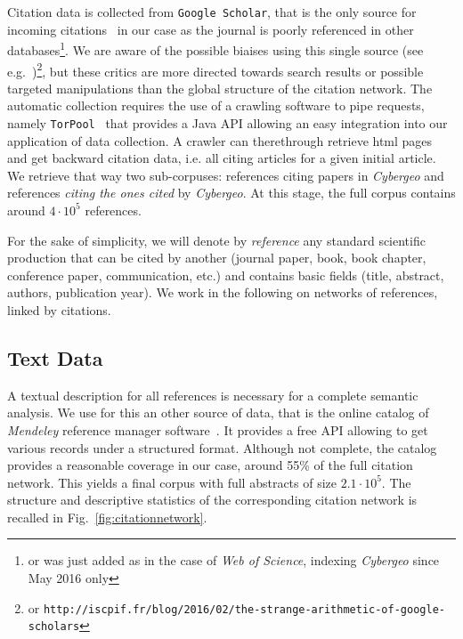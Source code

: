 Citation data is collected from \texttt{Google Scholar}, that is the only source for incoming citations~\citep{noruzi2005google} in our case as the journal is poorly referenced in other databases\footnote{or was just added as in the case of \textit{Web of Science}, indexing \textit{Cybergeo} since May 2016 only}. We are aware of the possible biaises using this single source (see e.g.~\cite{bohannon2014scientific})\footnote{or \texttt{http://iscpif.fr/blog/2016/02/the-strange-arithmetic-of-google-scholars}}, but these critics are more directed towards search results or possible targeted manipulations than the global structure of the citation network. The automatic collection requires the use of a crawling software to pipe requests, namely \texttt{TorPool}~\citep{torpool} that provides a Java API allowing an easy integration into our application of data collection. A crawler can therethrough retrieve html pages and get backward citation data, i.e. all citing articles for a given initial article. We retrieve that way two sub-corpuses: references citing papers in \textit{Cybergeo} and references \emph{citing the ones cited} by \textit{Cybergeo}. At this stage, the full corpus contains around $4\cdot10^5$ references.


For the sake of simplicity, we will denote by \emph{reference} any standard scientific production that can be cited by another (journal paper, book, book chapter, conference paper, communication, etc.) and contains basic fields (title, abstract, authors, publication year). We work in the following on networks of references, linked by citations.



\subsection*{Text Data}

A textual description for all references is necessary for a complete semantic analysis. We use for this an other source of data, that is the online catalog of \textit{Mendeley} reference manager software~\cite{mendeley}. It provides a free API allowing to get various records under a structured format. Although not complete, the catalog provides a reasonable coverage in our case, around 55\% of the full citation network. This yields a final corpus with full abstracts of size $2.1\cdot 10^5$. The structure and descriptive statistics of the corresponding citation network is recalled in Fig.~\ref{fig:citationnetwork}.


